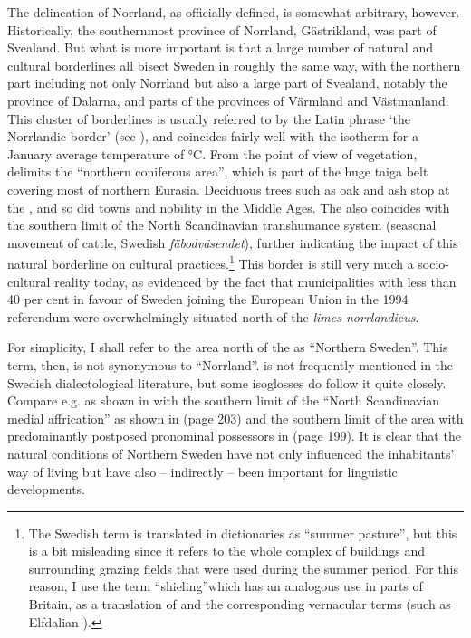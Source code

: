 The delineation of Norrland, as officially defined, is somewhat arbitrary, however. Historically, the southernmost province of Norrland, Gästrikland, was part of Svealand. But what is more important is that a large number of natural and cultural borderlines all bisect Sweden in roughly the same way, with the northern part including not only Norrland but also a large part of Svealand, notably the province of Dalarna, and parts of the provinces of Värmland and Västmanland. This cluster of borderlines is usually referred to by the Latin phrase  ‘the Norrlandic border’ (see ), and coincides fairly well with the isotherm for a January average temperature of °C. From the point of view of vegetation,  delimits the “northern coniferous area”, which is part of the huge taiga belt covering most of northern Eurasia. Deciduous trees such as oak and ash stop at the , and so did towns and nobility in the Middle Ages. The  also coincides with the southern limit of the North Scandinavian transhumance system (seasonal movement of cattle, Swedish \textit{fäbodväsendet}), further indicating the impact of this natural borderline on cultural practices.\footnote{ The Swedish term is translated in dictionaries as “summer pasture”, but this is a bit misleading since it refers to the whole complex of buildings and surrounding grazing fields that were used during the summer period. For this reason, I use the term “shieling”\textstyleLinguisticExample{, }which has an analogous use in parts of Britain, as a translation of  and the corresponding vernacular terms (such as Elfdalian ).} This border is still very much a socio-cultural reality today, as evidenced by the fact that municipalities with less than 40 per cent in favour of Sweden joining the European Union in the 1994 referendum were overwhelmingly situated north of the \textit{limes norrlandicus}.

For simplicity, I shall refer to the area north of the  as “Northern Sweden”. This term, then, is not synonymous to “Norrland”.  is not frequently mentioned in the Swedish dialectological literature, but some isoglosses do follow it quite closely. Compare e.g.  as shown in  with the southern limit of the “North Scandinavian medial affrication” as shown in  (page 203) and the southern limit of the area with predominantly postposed pronominal possessors in  (page 199). It is clear that the natural conditions of Northern Sweden have not only influenced the inhabitants’ way of living but have also – indirectly – been important for linguistic developments.

